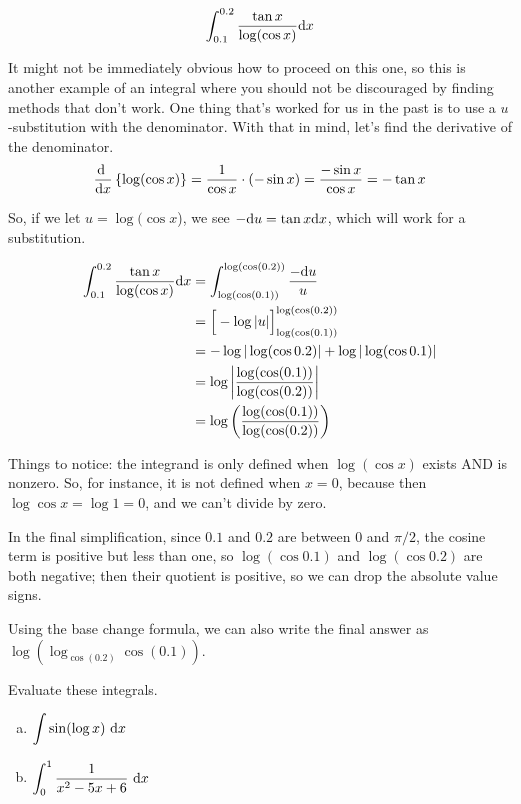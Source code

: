 \begin{solution}
\[\int_{0.1}^{0.2} \frac{\tan x}{\log(\cos x)}  \mathrm{d}x\]

It might not be immediately obvious how to proceed on this one, so this is another example of an integral where you should not be discouraged by finding methods that don't work. One thing that's worked for us in the past is to use a $u$-substitution with the denominator. With that in mind, let's find the derivative of the denominator.
\[\diff{}{x}\left\{\log(\cos x)\right\}= \frac{1}{\cos x}\cdot (-\sin x) = \frac{-\sin x}{\cos x} = -\tan x\]

So, if we let $u=\log(\cos x$), we see $-\mathrm{d}u=\tan x \mathrm{d}x$, which will work for a substitution.

\begin{align*}
\int_{0.1}^{0.2} \frac{\tan x}{\log(\cos x)}  \mathrm{d}x&=
\int_{\log(\cos(0.1))}^{\log(\cos(0.2))} \frac{-\mathrm{d}u}{u}\\
&=\Big[-\log|u|\Big]_{\log(\cos(0.1))}^{\log(\cos(0.2))} \\
&=
-\log|\log(\cos 0.2)|+\log|\log(\cos 0.1)|\\
&={\log\left|\frac{\log(\cos(0.1))}{\log(\cos(0.2))}\right|}\\&=
\log\left(\frac{\log(\cos(0.1))}{\log(\cos(0.2))}\right)
\end{align*}

Things to notice: the integrand is only defined when $\log(\cos x)$ exists AND is nonzero. So, for instance, it is not defined when $x=0$, because then $\log\cos x = \log1=0$, and we can't divide by zero.

In the final simplification, since $0.1$ and $0.2$ are between 0 and $\pi/2$, the cosine term is positive but less than one, so $\log(\cos 0.1)$ and $\log(\cos 0.2)$ are both negative; then their quotient is positive, so we can drop the absolute value signs.

Using the base change formula, we can also write the final answer as
$\log\left(\log_{\cos (0.2)}\cos(0.1)\right)$.

\end{solution}

\begin{question}[M105 2012A]
Evaluate these integrals.

\begin{enumerate}[(a)]
\item
$\displaystyle\int\sin(\log x) \ \dee{x}$
\item
$\displaystyle\int_0^1\frac{1}{x^2-5x+6}\ \dee{x}$
\end{enumerate}
\end{question}

